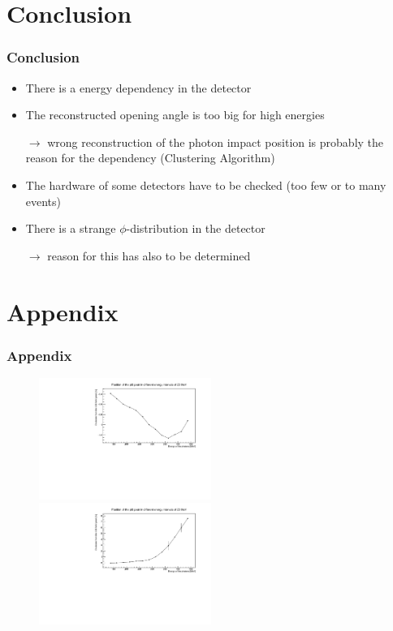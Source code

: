 \documentclass[slidestop,compress,mathserif]{beamer}
\begin{document}
\section{Conclusion}
\begin{frame}
	\frametitle{Conclusion}
	\begin{itemize}
		\item There is a energy dependency in the detector
		\item The reconstructed opening angle is too big for high energies
		
		$\rightarrow$ wrong reconstruction of the photon impact position is probably the reason for the dependency (Clustering Algorithm) 
		\item The hardware of some detectors have to be checked (too few or to many events)
		\item There is a strange $\phi$-distribution in the detector
		
		$\rightarrow$ reason for this has also to be determined
	\end{itemize}
\end{frame}
\section{Appendix}
\begin{frame}
	\frametitle{Appendix}
	
	\begin{figure}
		\includegraphics[width=0.5\textwidth]{Pictures/20170724RecETrueOAngle}
		\includegraphics[width=0.5\textwidth]{Pictures/20170724TrueERecOAngle}
	
	\end{figure}
\end{frame}
\end{document}
